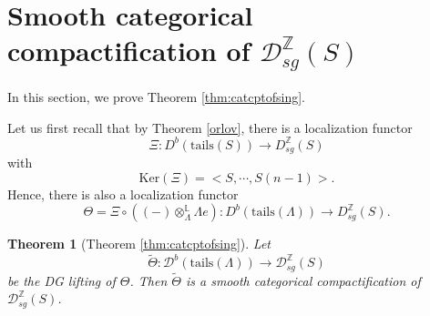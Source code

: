 \documentclass[11pt,reqno]{amsart}
\newtheorem{theorem}{Theorem}[section]
\theoremstyle{definition}
\begin{document}
\section{Smooth categorical compactification of $\mathcal{D}_{sg}^{\mathbb{Z}}(S)$}\label{Fina}


In this section, we prove Theorem \ref{thm:catcptofsing}.


Let us first recall that by Theorem \ref{orlov}, there is a localization functor
$$
\Xi: D^{b}(\mathrm{tails}(S)) \rightarrow D^{\mathbb{Z}}_{sg}(S)
$$
with
$$
\mathrm{Ker}(\Xi) = \big< S, \cdots, S(n-1) \big>.
$$
Hence, there is also a localization functor
$$
\Theta =\Xi \circ ((-) \otimes^{\mathbb{L}}_{\Lambda} \Lambda e ): D^{b}(\mathrm{tails}
(\Lambda)) \rightarrow D^{\mathbb{Z}}_{sg}(S).
$$


\begin{theorem}[Theorem \ref{thm:catcptofsing}]\label{thm:catcptofsingequiv}
Let
$$
\tilde{\Theta}: \mathcal{D}^{b}(\mathrm{tails}(\Lambda)) 
\rightarrow \mathcal{D}_{sg}^{\mathbb{Z}}(S)
$$
be the DG lifting of $\Theta$. Then $\tilde\Theta$
is a smooth categorical compactification of $\mathcal{D}_{sg}^{\mathbb{Z}}(S)$. \end{theorem} 
 
\end{document}
